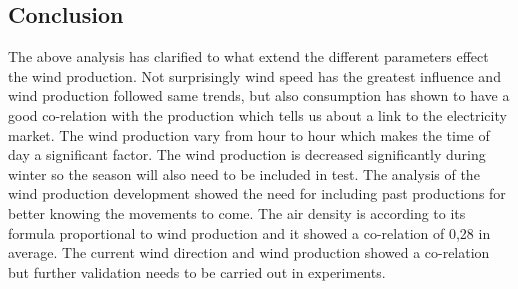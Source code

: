 

\subsection{Conclusion}
The above analysis has clarified to what extend the different parameters effect the wind production. Not surprisingly wind speed has the greatest influence and wind production followed same trends, but also consumption has shown to have a good co-relation with the production which tells us about a link to the electricity market. The wind production vary from hour to hour which makes the time of day a significant factor. The wind production is decreased significantly during winter so the season will also need to be included in test. The analysis of the wind production development showed the need for including past productions for better knowing the movements to come.
The air density is according to its formula proportional to wind production and it showed a co-relation of 0,28 in average. The current wind direction and wind production showed a co-relation but further validation needs to be carried out in experiments.